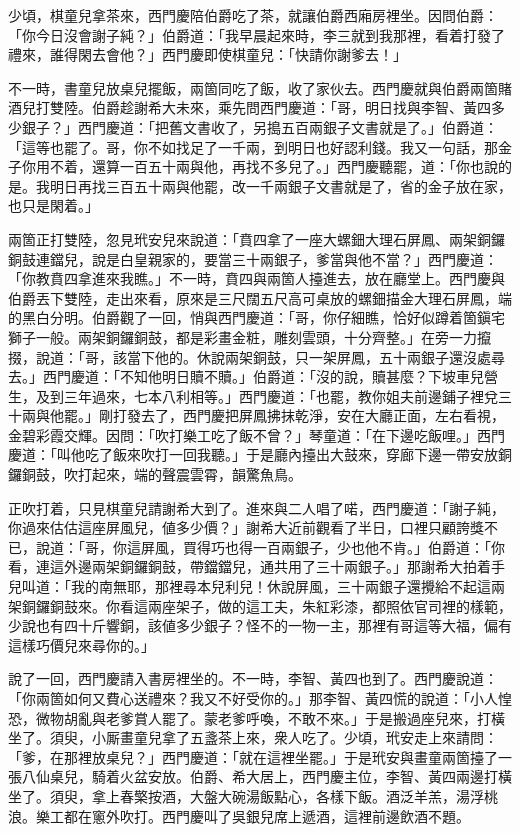少頃，棋童兒拿茶來，西門慶陪伯爵吃了茶，就讓伯爵西廂房裡坐。因問伯爵：「你今日沒會謝子純？」伯爵道：「我早晨起來時，李三就到我那裡，看着打發了禮來，誰得閑去會他？」西門慶即使棋童兒：「快請你謝爹去！」

不一時，書童兒放桌兒擺飯，兩箇同吃了飯，收了家伙去。西門慶就與伯爵兩箇賭酒兒打雙陸。伯爵趁謝希大未來，乘先問西門慶道：「哥，明日找與李智、黃四多少銀子？」西門慶道：「把舊文書收了，另搗五百兩銀子文書就是了。」伯爵道：「這等也罷了。哥，你不如找足了一千兩，到明日也好認利錢。我又一句話，那金子你用不着，還算一百五十兩與他，再找不多兒了。」西門慶聽罷，道：「你也說的是。我明日再找三百五十兩與他罷，改一千兩銀子文書就是了，省的金子放在家，也只是閑着。」

兩箇正打雙陸，忽見玳安兒來說道：「賁四拿了一座大螺鈿大理石屏鳳、兩架銅鑼銅鼓連鐺兒，說是白皇親家的，要當三十兩銀子，爹當與他不當？」西門慶道：「你教賁四拿進來我瞧。」不一時，賁四與兩箇人擡進去，放在廳堂上。西門慶與伯爵丟下雙陸，走出來看，原來是三尺闊五尺高可桌放的螺鈿描金大理石屏鳳，端的黑白分明。伯爵觀了一回，悄與西門慶道：「哥，你仔細瞧，恰好似蹲着箇鎭宅獅子一般。兩架銅鑼銅鼓，都是彩畫金粧，雕刻雲頭，十分齊整。」在旁一力攛掇，說道：「哥，該當下他的。休說兩架銅鼓，只一架屏鳳，五十兩銀子還沒處尋去。」西門慶道：「不知他明日贖不贖。」伯爵道：「沒的說，贖甚麼？下坡車兒營生，及到三年過來，七本八利相等。」西門慶道：「也罷，教你姐夫前邊鋪子裡兌三十兩與他罷。」剛打發去了，西門慶把屏鳳拂抹乾淨，安在大廳正面，左右看視，金碧彩霞交輝。因問：「吹打樂工吃了飯不曾？」琴童道：「在下邊吃飯哩。」西門慶道：「叫他吃了飯來吹打一回我聽。」于是廳內擡出大鼓來，穿廊下邊一帶安放銅鑼銅鼓，吹打起來，端的聲震雲霄，韻驚魚鳥。

正吹打着，只見棋童兒請謝希大到了。進來與二人唱了喏，西門慶道：「謝子純，你過來估估這座屏風兒，値多少價？」謝希大近前觀看了半日，口裡只顧誇獎不已，說道：「哥，你這屏風，買得巧也得一百兩銀子，少也他不肯。」伯爵道：「你看，連這外邊兩架銅鑼銅鼓，帶鐺鐺兒，通共用了三十兩銀子。」那謝希大拍着手兒叫道：{}「我的南無耶，那裡尋本兒利兒！休說屏風，三十兩銀子還攪給不起這兩架銅鑼銅鼓來。你看這兩座架子，做的這工夫，朱紅彩漆，都照依官司裡的樣範，少說也有四十斤響銅，該値多少銀子？怪不的一物一主，那裡有哥這等大福，偏有這樣巧價兒來尋你的。」

說了一回，西門慶請入書房裡坐的。不一時，李智、黃四也到了。西門慶說道：「你兩箇如何又費心送禮來？我又不好受你的。」那李智、黃四慌的說道：「小人惶恐，微物胡亂與老爹賞人罷了。蒙老爹呼喚，不敢不來。」于是搬過座兒來，打橫坐了。須臾，小厮畫童兒拿了五盞茶上來，衆人吃了。少頃，玳安走上來請問：「爹，在那裡放桌兒？」西門慶道：「就在這裡坐罷。」于是玳安與畫童兩箇擡了一張八仙桌兒，騎着火盆安放。伯爵、希大居上，西門慶主位，李智、黃四兩邊打橫坐了。須臾，拿上春檠按酒，大盤大碗湯飯點心，各樣下飯。酒泛羊羔，湯浮桃浪。樂工都在窻外吹打。西門慶叫了吳銀兒席上遞酒，這裡前邊飲酒不題。

